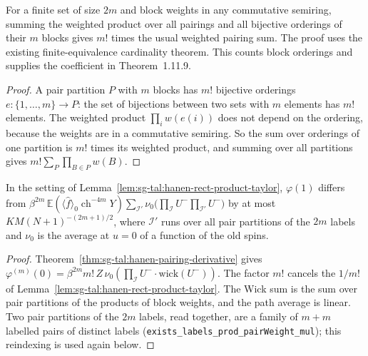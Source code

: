 \begin{lemma}\label{lem:sg-tal:hanen-pairing-orderings}
\leanok
{}
For a finite set of size $2m$ and block weights in any commutative semiring,
summing the weighted product over all pairings and all bijective orderings of
their $m$ blocks gives $m!$ times the usual weighted pairing sum. The proof
uses the existing finite-equivalence cardinality theorem. This counts block
orderings and supplies the coefficient in Theorem~1.11.9.
\end{lemma}
\begin{proof}
\leanok
A pair partition $P$ with $m$ blocks has $m!$ bijective orderings $e:\{1,\dots,m\}\to P$: the set of bijections between two sets with $m$ elements has $m!$ elements.
The weighted product $\prod_i w(e(i))$ does not depend on the ordering, because the weights are in a commutative semiring. So the sum over orderings of one partition is $m!$ times its weighted product, and summing over all partitions gives
$m!\sum_P\prod_{B\in P}w(B)$.
\end{proof}

\begin{lemma}\label{lem:sg-tal:hanen-rect-leading}
\leanok
{}
In the setting of Lemma~\ref{lem:sg-tal:hanen-rect-product-taylor}, $\varphi(1)$ differs from
$\beta^{2m}\,\mathbb E(\langle\hat f\rangle_0\operatorname{ch}^{-4m}Y)\sum_{\mathcal I'}\nu_0\bigl(\prod_{\mathcal I}U^-\prod_{\mathcal I'}U^-\bigr)$
by at most $K M (N+1)^{-(2m+1)/2}$, where $\mathcal I'$ runs over all pair partitions of the $2m$ labels
and $\nu_0$ is the average at $u=0$ of a function of the old spins.
\end{lemma}
\begin{proof}
\leanok
Theorem~\ref{thm:sg-tal:hanen-pairing-derivative} gives $\varphi^{(m)}(0)=\beta^{2m}m!\,Z\,\nu_0(\prod_{\mathcal I}U^-\cdot\mathrm{wick}(U^-))$.
The factor $m!$ cancels the $1/m!$ of Lemma~\ref{lem:sg-tal:hanen-rect-product-taylor}. The Wick sum is the sum over pair partitions
of the products of block weights, and the path average is linear. Two pair partitions of the $2m$ labels,
read together, are a family of $m+m$ labelled pairs of distinct labels
(\texttt{exists\_labels\_prod\_pairWeight\_mul}); this reindexing is used again below.
\end{proof}

